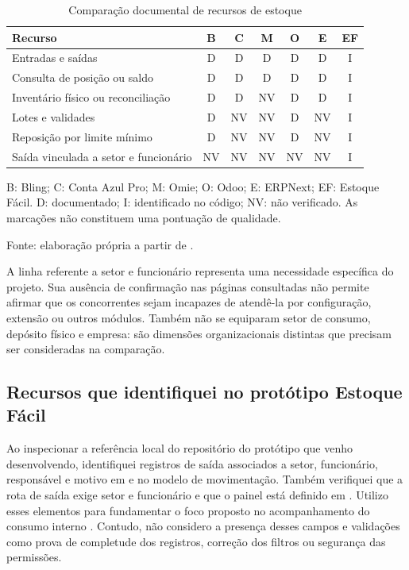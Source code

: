 \begin{table}[htb]
\centering
\caption{Comparação documental de recursos de estoque}
\label{tab:solucoes}
\small
\begin{tabular}{p{}ccccc c}
\hline
\textbf{Recurso} & \textbf{B} & \textbf{C} & \textbf{M} & \textbf{O} & \textbf{E} & \textbf{EF} \\ \hline
Entradas e saídas & D & D & D & D & D & I \\ \hline
Consulta de posição ou saldo & D & D & D & D & D & I \\ \hline
Inventário físico ou reconciliação & D & D & NV & D & D & I \\ \hline
Lotes e validades & D & NV & NV & D & NV & I \\ \hline
Reposição por limite mínimo & D & NV & NV & D & NV & I \\ \hline
Saída vinculada a setor e funcionário & NV & NV & NV & NV & NV & I \\ \hline
\end{tabular}
\par\smallskip
\begin{minipage}{0.97\textwidth}
\footnotesize B: Bling; C: Conta Azul Pro; M: Omie; O: Odoo; E: ERPNext; EF: Estoque Fácil. D: documentado; I: identificado no código; NV: não verificado. As marcações não constituem uma pontuação de qualidade.\par
Fonte: elaboração própria a partir de \cite{BlingEstoque,ContaAzulEstoque,OmieEstoque,OdooInventoryFeatures,ERPNextStock,EstoqueFacilRepositorio}.
\end{minipage}
\end{table}

A linha referente a setor e funcionário representa uma necessidade específica do projeto. Sua ausência de confirmação nas páginas consultadas não permite afirmar que os concorrentes sejam incapazes de atendê-la por configuração, extensão ou outros módulos. Também não se equiparam setor de consumo, depósito físico e empresa: são dimensões organizacionais distintas que precisam ser consideradas na comparação.

\subsection{Recursos que identifiquei no protótipo Estoque Fácil}

Ao inspecionar a referência local do repositório do protótipo que venho desenvolvendo, identifiquei registros de saída associados a setor, funcionário, responsável e motivo em  e no modelo de movimentação. Também verifiquei que a rota de saída exige setor e funcionário e que o painel está definido em . Utilizo esses elementos para fundamentar o foco proposto no acompanhamento do consumo interno \cite{EstoqueFacilRepositorio}. Contudo, não considero a presença desses campos e validações como prova de completude dos registros, correção dos filtros ou segurança das permissões.

